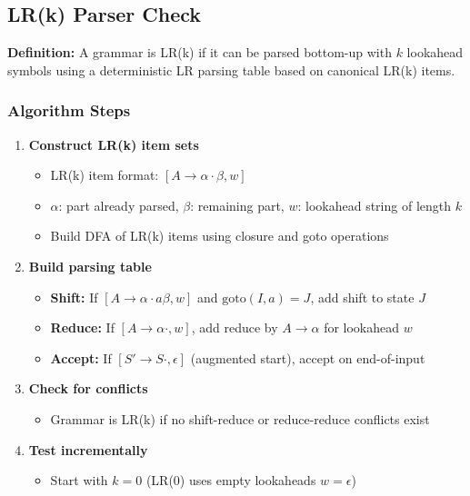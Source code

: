 \subsection{LR(k) Parser Check}

\textbf{Definition:} A grammar is LR(k) if it can be parsed bottom-up with $k$ lookahead symbols using a deterministic LR parsing table based on canonical LR(k) items.

\subsubsection{Algorithm Steps}

\begin{enumerate}
    \item \textbf{Construct LR(k) item sets}
    \begin{itemize}
        \item LR(k) item format: $[A \to \alpha \cdot \beta, w]$
        \item $\alpha$: part already parsed, $\beta$: remaining part, $w$: lookahead string of length $k$
        \item Build DFA of LR(k) items using closure and goto operations
    \end{itemize}
    
    \item \textbf{Build parsing table}
    \begin{itemize}
        \item \textbf{Shift:} If $[A \to \alpha \cdot a \beta, w]$ and $\text{goto}(I, a) = J$, add shift to state $J$
        \item \textbf{Reduce:} If $[A \to \alpha \cdot, w]$, add reduce by $A \to \alpha$ for lookahead $w$
        \item \textbf{Accept:} If $[S' \to S \cdot, \epsilon]$ (augmented start), accept on end-of-input
    \end{itemize}
    
    \item \textbf{Check for conflicts}
    \begin{itemize}
        \item Grammar is LR(k) if no shift-reduce or reduce-reduce conflicts exist
    \end{itemize}
    
    \item \textbf{Test incrementally}
    \begin{itemize}
        \item Start with $k = 0$ (LR(0) uses empty lookaheads $w = \epsilon$)
    \end{itemize}
\end{enumerate}


